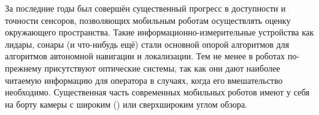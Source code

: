 
За последние годы был совершён существенный прогресс в доступности и точности сенсоров, позволяющих 
мобильным роботам осуществлять оценку окружающего пространства. Такие информационно-измерительные устройства
как лидары, сонары (и что-нибудь ещё) стали основной опорой алгоритмов для алгоритмов автономной навигации и локализации.
Тем не менее в роботах по-прежнему присутствуют оптические системы, так как они дают наиболее читаемую информацию для 
оператора в случаях, когда его вмешательство необходимо.   Существенная часть современных мобильных роботов имеют у себя на 
борту камеры с широким () или сверхшироким углом обзора. 